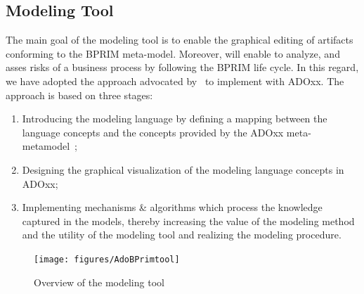 \documentclass[preprint,3p,times,number]{elsarticle}
\begin{document}
\subsection{\adobprim{} Modeling Tool}
The main goal of the \adobprim{} modeling tool is to enable the graphical editing of artifacts conforming to the BPRIM meta-model. Moreover, \adobprim{} will enable to analyze, and asses risks of a business process by following the BPRIM life cycle. In this regard, we have adopted the approach advocated by~\citet{Bork.2010} to implement \adobprim{} with ADOxx. The approach is based on three stages:
\begin{enumerate}
    \item Introducing the modeling language by defining a mapping between the language concepts and the concepts provided by the ADOxx meta-metamodel~\cite{KaragiannisKuehn02};
    \item Designing the graphical visualization of the modeling language concepts in ADOxx;
    \item Implementing mechanisms \& algorithms which process the knowledge captured in the models, thereby increasing the value of the modeling method and the utility of the modeling tool and realizing the modeling procedure.
\end{enumerate}

\begin{figure}[t]
 \begin{center}
    \texttt{[image: figures/AdoBPrimtool]}
    \caption{Overview of the \adobprim{} modeling tool}
    \label{fig:MUP_BPRIM}
 \end{center}
\end{figure}
\end{document}
